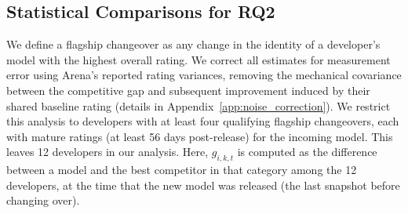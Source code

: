 \subsection{Statistical Comparisons for RQ2}
\label{app:statistical_rq2}
We define a flagship changeover as any change in the identity of a developer's model with the highest overall rating.
We correct all estimates for measurement error using Arena's reported rating variances, removing the mechanical covariance between the competitive gap and subsequent improvement induced by their shared baseline rating (details in Appendix~\ref{app:noise_correction}).
We restrict this analysis to developers with at least four qualifying flagship changeovers, each with mature ratings (at least 56 days post-release) for the incoming model. 
This leaves 12 developers in our analysis.
Here, $g_{i,k,t}$ is computed as the difference between a model and the best competitor in that category among the 12 developers, at the time that the new model was released (the last snapshot before changing over).
